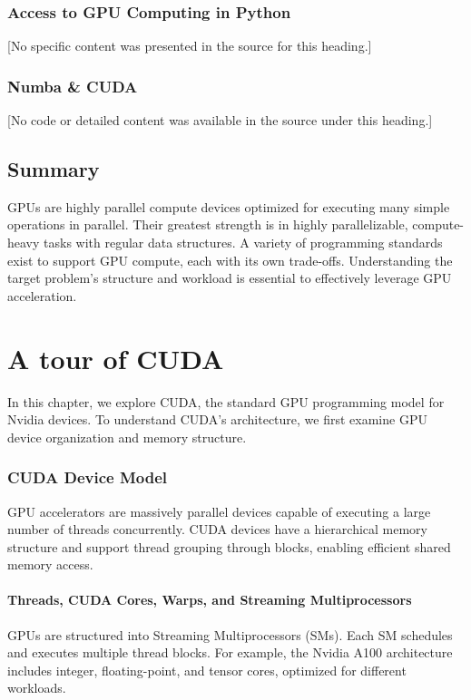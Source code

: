 \documentclass[11pt,a4paper]{book}
\begin{document}
\subsection*{Access to GPU Computing in Python}

[No specific content was presented in the source for this heading.]

\subsection*{Numba \& CUDA}

[No code or detailed content was available in the source under this heading.]

\section*{Summary}

GPUs are highly parallel compute devices optimized for executing many simple operations in parallel. Their greatest strength is in highly parallelizable, compute-heavy tasks with regular data structures. A variety of programming standards exist to support GPU compute, each with its own trade-offs. Understanding the target problem’s structure and workload is essential to effectively leverage GPU acceleration.

\chapter{A tour of CUDA}

In this chapter, we explore CUDA, the standard GPU programming model for Nvidia devices. To understand CUDA’s architecture, we first examine GPU device organization and memory structure.

\subsection*{CUDA Device Model}
GPU accelerators are massively parallel devices capable of executing a large number of threads concurrently. CUDA devices have a hierarchical memory structure and support thread grouping through blocks, enabling efficient shared memory access.

\subsubsection*{Threads, CUDA Cores, Warps, and Streaming Multiprocessors}
GPUs are structured into Streaming Multiprocessors (SMs). Each SM schedules and executes multiple thread blocks. For example, the Nvidia A100 architecture includes integer, floating-point, and tensor cores, optimized for different workloads.
\end{document}
